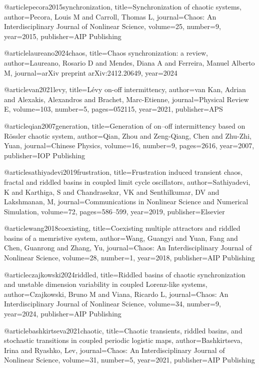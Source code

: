 @article{pecora2015synchronization,
  title={Synchronization of chaotic systems},
  author={Pecora, Louis M and Carroll, Thomas L},
  journal={Chaos: An Interdisciplinary Journal of Nonlinear Science},
  volume={25},
  number={9},
  year={2015},
  publisher={AIP Publishing}
}

@article{laureano2024chaos,
  title={Chaos synchronization: a review},
  author={Laureano, Rosario D and Mendes, Diana A and Ferreira, Manuel Alberto M},
  journal={arXiv preprint arXiv:2412.20649},
  year={2024}
}



@article{van2021levy,
  title={L{\'e}vy on-off intermittency},
  author={van Kan, Adrian and Alexakis, Alexandros and Brachet, Marc-Etienne},
  journal={Physical Review E},
  volume={103},
  number={5},
  pages={052115},
  year={2021},
  publisher={APS}
}

@article{qian2007generation,
  title={Generation of on--off intermittency based on R{\"o}ssler chaotic system},
  author={Qian, Zhou and Zeng-Qiang, Chen and Zhu-Zhi, Yuan},
  journal={Chinese Physics},
  volume={16},
  number={9},
  pages={2616},
  year={2007},
  publisher={IOP Publishing}
}




@article{sathiyadevi2019frustration,
  title={Frustration induced transient chaos, fractal and riddled basins in coupled limit cycle oscillators},
  author={Sathiyadevi, K and Karthiga, S and Chandrasekar, VK and Senthilkumar, DV and Lakshmanan, M},
  journal={Communications in Nonlinear Science and Numerical Simulation},
  volume={72},
  pages={586--599},
  year={2019},
  publisher={Elsevier}
}

@article{wang2018coexisting,
  title={Coexisting multiple attractors and riddled basins of a memristive system},
  author={Wang, Guangyi and Yuan, Fang and Chen, Guanrong and Zhang, Yu},
  journal={Chaos: An Interdisciplinary Journal of Nonlinear Science},
  volume={28},
  number={1},
  year={2018},
  publisher={AIP Publishing}
}


@article{czajkowski2024riddled,
  title={Riddled basins of chaotic synchronization and unstable dimension variability in coupled Lorenz-like systems},
  author={Czajkowski, Bruno M and Viana, Ricardo L},
  journal={Chaos: An Interdisciplinary Journal of Nonlinear Science},
  volume={34},
  number={9},
  year={2024},
  publisher={AIP Publishing}
}




@article{bashkirtseva2021chaotic,
  title={Chaotic transients, riddled basins, and stochastic transitions in coupled periodic logistic maps},
  author={Bashkirtseva, Irina and Ryashko, Lev},
  journal={Chaos: An Interdisciplinary Journal of Nonlinear Science},
  volume={31},
  number={5},
  year={2021},
  publisher={AIP Publishing}
}



